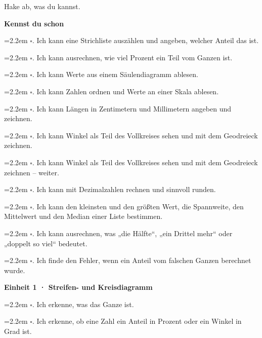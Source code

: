 \eng
\hypertarget{abhaken}{}
\begingroup\setlength{\parskip}{3pt}
\noindent Hake ab, was du kannst.\par\medskip
\par\medskip\noindent\textbf{Kennst du schon}\par\smallskip
\noindent\hangindent=2.2em $\square$. Ich kann eine Strichliste auszählen und angeben, welcher Anteil das ist.\par
\noindent\hangindent=2.2em $\square$. Ich kann ausrechnen, wie viel Prozent ein Teil vom Ganzen ist.\par
\noindent\hangindent=2.2em $\square$. Ich kann Werte aus einem Säulendiagramm ablesen.\par
\noindent\hangindent=2.2em $\square$. Ich kann Zahlen ordnen und Werte an einer Skala ablesen.\par
\noindent\hangindent=2.2em $\square$. Ich kann Längen in Zentimetern und Millimetern angeben und zeichnen.\par
\noindent\hangindent=2.2em $\square$. Ich kann Winkel als Teil des Vollkreises sehen und mit dem Geodreieck zeichnen.\par
\noindent\hangindent=2.2em $\square$. Ich kann Winkel als Teil des Vollkreises sehen und mit dem Geodreieck zeichnen – weiter.\par
\noindent\hangindent=2.2em $\square$. Ich kann mit Dezimalzahlen rechnen und sinnvoll runden.\par
\noindent\hangindent=2.2em $\square$. Ich kann den kleinsten und den größten Wert, die Spannweite, den Mittelwert und den Median einer Liste bestimmen.\par
\noindent\hangindent=2.2em $\square$. Ich kann ausrechnen, was „die Hälfte“, „ein Drittel mehr“ oder „doppelt so viel“ bedeutet.\par
\noindent\hangindent=2.2em $\square$. Ich finde den Fehler, wenn ein Anteil vom falschen Ganzen berechnet wurde.\par
\par\medskip\noindent\textbf{Einheit 1 · Streifen- und Kreisdiagramm}\par\smallskip
\noindent\hangindent=2.2em $\square$. Ich erkenne, was das Ganze ist.\par
\noindent\hangindent=2.2em $\square$. Ich erkenne, ob eine Zahl ein Anteil in Prozent oder ein Winkel in Grad ist.\par
